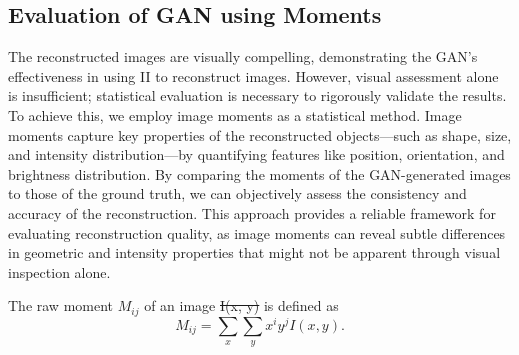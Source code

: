 \documentclass[fleqn,usenatbib,twocolumn]{mnras}
\makeatletter
\providecommand{\DIFadd}[1]{{\protect\color{blue}\uwave{#1}}} %
\providecommand{\DIFdel}[1]{{\protect\color{red}\sout{#1}}} %
\providecommand{\DIFaddbegin}{} %
\providecommand{\DIFaddend}{} %
\providecommand{\DIFdelbegin}{} %
\providecommand{\DIFdelend}{} %
\newcommand{\DIFscaledelfig}{0.5}
\newlength{\DIFdelgraphicswidth} %
\newlength{\DIFdelgraphicsheight} %
\newcommand{\DIFaddincludegraphics}[2][]{{\color{blue}\fbox{\DIFOincludegraphics[#1]{#2}}}} %
\newcommand{\DIFdelincludegraphics}[2][]{%
\sbox{\DIFdelgraphicsbox}{\DIFOincludegraphics[#1]{#2}}%
\settoboxwidth{\DIFdelgraphicswidth}{\DIFdelgraphicsbox} %
\settoboxtotalheight{\DIFdelgraphicsheight}{\DIFdelgraphicsbox} %
\scalebox{\DIFscaledelfig}{%
\parbox[b]{\DIFdelgraphicswidth}{\usebox{\DIFdelgraphicsbox}\\[-\baselineskip] \rule{\DIFdelgraphicswidth}{0em}}\llap{\resizebox{\DIFdelgraphicswidth}{\DIFdelgraphicsheight}{%
\setlength{\unitlength}{\DIFdelgraphicswidth}%
\begin{picture}(1,1)%
\thicklines\linethickness{2pt} %
{\color[rgb]{1,0,0}\put(0,0){\framebox(1,1){}}}%
{\color[rgb]{1,0,0}\put(0,0){\line( 1,1){1}}}%
{\color[rgb]{1,0,0}\put(0,1){\line(1,-1){1}}}%
\end{picture}%
}\hspace*{3pt}}} %
} %
\DeclareRobustCommand{\DIFaddbegin}{\DIFOaddbegin \let\includegraphics\DIFaddincludegraphics} %
\DeclareRobustCommand{\DIFaddend}{\DIFOaddend \let\includegraphics\DIFOincludegraphics} %
\DeclareRobustCommand{\DIFdelbegin}{\DIFOdelbegin \let\includegraphics\DIFdelincludegraphics} %
\DeclareRobustCommand{\DIFdelend}{\DIFOaddend \let\includegraphics\DIFOincludegraphics} %
\let\sout@orig\sout %
\renewcommand{\sout}[1]{\ifmmode\text{\sout@orig{\ensuremath{#1}}}\else\sout@orig{#1}\fi} %
\makeatother
\begin{document}
\subsection{Evaluation of GAN using Moments}
The reconstructed images are visually compelling, demonstrating the GAN's effectiveness in using II to reconstruct images. However, visual assessment alone is insufficient; statistical evaluation is necessary to rigorously validate the results. To achieve this, we employ image moments as a statistical method. Image moments capture key properties of the reconstructed objects—such as shape, size, and intensity distribution—by quantifying features like position, orientation, and brightness distribution. By comparing the moments of the GAN-generated images to those of the ground truth, we can objectively assess the consistency and accuracy of the reconstruction. This approach provides a reliable framework for evaluating reconstruction quality, as image moments can reveal subtle differences in geometric and intensity properties that might not be apparent through visual inspection alone.

The raw moment $M_{ij}$ of an image \DIFdelbegin \DIFdel{I(x, y) }\DIFdelend \DIFaddbegin \DIFadd{$I(x, y)$ }\DIFaddend is defined as \citep{hu1962visual}
\begin{equation}
	M_{ij} = \sum_{x} \sum_{y} x^i y^j I(x, y).
	\label{eqn:Mom}
\end{equation}
\end{document}
